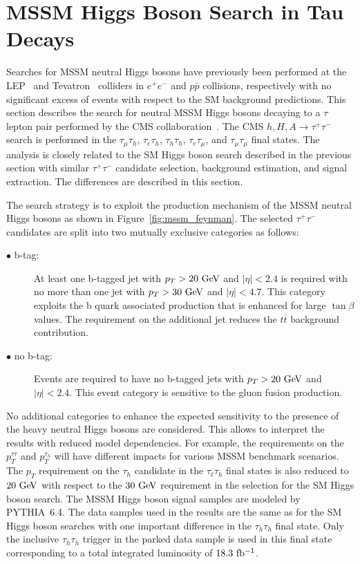  
\section{MSSM Higgs Boson Search in Tau Decays}

Searches for MSSM neutral Higgs bosons have previously been performed at the LEP~\cite{Schael:2006cr} and Tevatron~\cite{Aaltonen:2009vf,Abazov:2010ci,Abazov:2011jh,Aaltonen:2011nh} colliders in $e^+e^-$ and $p\bar{p}$ collisions, respectively with no significant excess of events with respect to the SM background predictions. This section describes the search for neutral MSSM Higgs bosons decaying to a $\tau$ lepton pair performed by the CMS collaboration~\cite{Khachatryan:2014wca}. The CMS $h,H,A\rightarrow\tau^{+}\tau^{-}$ search is performed in the $\tau_{\mu}\tau_h$, $\tau_e\tau_h$, $\tau_h\tau_h$, $\tau_e\tau_{\mu}$, and $\tau_{\mu}\tau_{\mu}$ final states.  The analysis is closely related to the SM Higgs boson search described in the previous section with similar $\tau^{+}\tau^{-}$ candidate selection, background estimation, and signal extraction. The differences are described in this section.

The search strategy is to exploit the production mechanism of the MSSM neutral Higgs bosons as shown in Figure~\ref{fig:mssm_feynman}. The selected $\tau^{+}\tau^{-}$ candidates are split into two mutually exclusive categories as follows:

\begin{description}
\item[$\bullet$ b-tag:] At least one b-tagged jet with $p_T>20~\mathrm{Ge\kern -0.1em V}$ and $|\eta|<2.4$ is required with no more than one jet with $p_{T}>30~\mathrm{Ge\kern -0.1em V}$ and $|\eta|<4.7$. This category exploits the b quark associated production that is enhanced for large $\tan\beta$ values. The requirement on the additional jet reduces the $t\bar{t}$ background contribution.
\item[$\bullet$ no b-tag:] Events are required to have no b-tagged jets with $p_{T}>20~\mathrm{Ge\kern -0.1em V}$ and $|\eta|<2.4$. This event category is sensitive to the gluon fusion production.
\end{description}  

No additional categories to enhance the expected sensitivity to the presence of the heavy neutral Higgs bosons are considered. This allows to interpret the results with reduced model dependencies. For example, the requirements on the $p_{T}^{\tau\tau}$ and $p_{T}^{\tau_h}$ will have  different impacts for various MSSM benchmark scenarios.  The $p_{T}$ requirement on the $\tau_h$ candidate in the $\tau_{\ell}\tau_h$ final states is also reduced to $20~\mathrm{Ge\kern -0.1em V}$ with respect to the $30~\mathrm{Ge\kern -0.1em V}$ requirement in the selection for the SM Higgs boson search. The MSSM  Higgs boson signal samples are modeled by PYTHIA~6.4. The data samples used in the results are the same as for the SM Higgs boson searches with one important difference in the $\tau_h\tau_h$ final state. Only the inclusive $\tau_h\tau_h$ trigger in the parked data sample is used in this final state corresponding to a total integrated luminosity of $18.3~\mathrm{fb^{-1}}$.   

